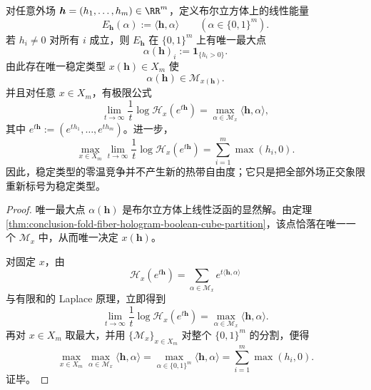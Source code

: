 \begin{corollary}[零温外场的正交象限选择律]\label{cor:conclusion-fold-zero-temperature-orthant-selection}
对任意外场 \(\boldsymbol h=(h_1,\dots,h_m)\in\RR^m\)，定义布尔立方体上的线性能量
\[
E_{\boldsymbol h}(\alpha):=\langle \boldsymbol h,\alpha\rangle
\qquad (\alpha\in\{0,1\}^m).
\]
若 \(h_i\neq 0\) 对所有 \(i\) 成立，则 \(E_{\boldsymbol h}\) 在 \(\{0,1\}^m\) 上有唯一最大点
\[
\alpha(\boldsymbol h)_i:=\mathbf 1_{\{h_i>0\}}.
\]
由此存在唯一稳定类型 \(x(\boldsymbol h)\in X_m\) 使
\[
\alpha(\boldsymbol h)\in \mathcal M_{x(\boldsymbol h)}.
\]
并且对任意 \(x\in X_m\)，有极限公式
\[
\lim_{t\to\infty}\frac{1}{t}\log \mathcal H_x(e^{t\boldsymbol h})
=
\max_{\alpha\in \mathcal M_x}\langle \boldsymbol h,\alpha\rangle,
\]
其中 \(e^{t\boldsymbol h}:=(e^{th_1},\dots,e^{th_m})\)。进一步，
\[
\max_{x\in X_m}\lim_{t\to\infty}\frac{1}{t}\log \mathcal H_x(e^{t\boldsymbol h})
=
\sum_{i=1}^{m}\max(h_i,0).
\]
因此，稳定类型的零温竞争并不产生新的热带自由度；它只是把全部外场正交象限重新标号为稳定类型。
\end{corollary}
\begin{proof}
唯一最大点 \(\alpha(\boldsymbol h)\) 是布尔立方体上线性泛函的显然解。由定理 \ref{thm:conclusion-fold-fiber-hologram-boolean-cube-partition}，该点恰落在唯一一个 \(\mathcal M_x\) 中，从而唯一决定 \(x(\boldsymbol h)\)。

对固定 \(x\)，由
\[
\mathcal H_x(e^{t\boldsymbol h})
=
\sum_{\alpha\in \mathcal M_x}e^{t\langle \boldsymbol h,\alpha\rangle}
\]
与有限和的 Laplace 原理，立即得到
\[
\lim_{t\to\infty}\frac{1}{t}\log \mathcal H_x(e^{t\boldsymbol h})
=
\max_{\alpha\in \mathcal M_x}\langle \boldsymbol h,\alpha\rangle.
\]
再对 \(x\in X_m\) 取最大，并用 \(\{\mathcal M_x\}_{x\in X_m}\) 对整个 \(\{0,1\}^m\) 的分割，便得
\[
\max_{x\in X_m}\max_{\alpha\in \mathcal M_x}\langle \boldsymbol h,\alpha\rangle
=
\max_{\alpha\in\{0,1\}^m}\langle \boldsymbol h,\alpha\rangle
=
\sum_{i=1}^{m}\max(h_i,0).
\]
证毕。
\end{proof}

